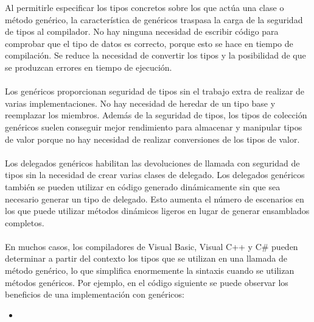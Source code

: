 \documentclass[10pt,a4paper]{article}
\newcommand{\perlscript}[2]{
	\begin{itemize}
	\item[]
	\end{itemize}
	}
\begin{document}
Al permitirle especificar los tipos concretos sobre los que act\'ua una clase o m\'etodo gen\'erico, la caracter\'istica de gen\'ericos traspasa la carga de la seguridad de tipos al compilador. No hay ninguna necesidad de escribir c\'odigo para comprobar que el tipo de datos es correcto, porque esto se hace en tiempo de compilaci\'on. Se reduce la necesidad de convertir los tipos y la posibilidad de que se produzcan errores en tiempo de ejecuci\'on.
\\\\
Los gen\'ericos proporcionan seguridad de tipos sin el trabajo extra de realizar de varias implementaciones. No hay necesidad de heredar de un tipo base y reemplazar los miembros. Adem\'as de la seguridad de tipos, los tipos de colecci\'on gen\'ericos suelen conseguir mejor rendimiento para almacenar y manipular tipos de valor porque no hay necesidad de realizar conversiones de los tipos de valor.
\\\\
Los delegados gen\'ericos habilitan las devoluciones de llamada con seguridad de tipos sin la necesidad de crear varias clases de delegado. Los delegados gen\'ericos tambi\'en se pueden utilizar en c\'odigo generado din\'amicamente sin que sea necesario generar un tipo de delegado. Esto aumenta el n\'umero de escenarios en los que puede utilizar m\'etodos din\'amicos ligeros en lugar de generar ensamblados completos.
\\\\
En muchos casos, los compiladores de Visual Basic, Visual C++ y C\# pueden determinar a partir del contexto los tipos que se utilizan en una llamada de m\'etodo gen\'erico, lo que simplifica enormemente la sintaxis cuando se utilizan m\'etodos gen\'ericos. Por ejemplo, en el c\'odigo siguiente se puede observar los beneficios de una implementaci\'on con gen\'ericos:

        \perlscript{EjemploLatex}{}
        
    
\end{document}
